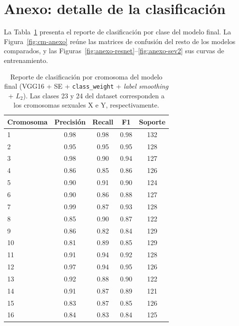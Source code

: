\documentclass[11pt,a4paper]{article}
\begin{document}



\appendix
\section{Anexo: detalle de la clasificación}
\label{anexo:clasif}

La Tabla~\ref{tab:clasif-report} presenta el reporte de clasificación por clase del
modelo final. La Figura~\ref{fig:cm-anexo} reúne las matrices de confusión del resto
de los modelos comparados, y las Figuras~\ref{fig:anexo-resnet}--\ref{fig:anexo-sev2}
sus curvas de entrenamiento.

\begin{table}[H]
  \centering
  \small
  \caption{Reporte de clasificación por cromosoma del modelo final (VGG16 + SE +
  \texttt{class\_weight} + \textit{label smoothing} + \(L_2\)). Las clases 23 y 24
  del dataset corresponden a los cromosomas sexuales X e Y, respectivamente.}
  \label{tab:clasif-report}
  \begin{tabular}{lcccc}
    \toprule
    Cromosoma & Precisión & Recall & F1 & Soporte \\
    \midrule
    1  & 0.98 & 0.98 & 0.98 & 132 \\
    2  & 0.95 & 0.95 & 0.95 & 128 \\
    3  & 0.98 & 0.90 & 0.94 & 127 \\
    4  & 0.86 & 0.85 & 0.86 & 126 \\
    5  & 0.90 & 0.91 & 0.90 & 124 \\
    6  & 0.90 & 0.86 & 0.88 & 127 \\
    7  & 0.99 & 0.87 & 0.93 & 128 \\
    8  & 0.85 & 0.90 & 0.87 & 122 \\
    9  & 0.86 & 0.82 & 0.84 & 129 \\
    10 & 0.81 & 0.89 & 0.85 & 129 \\
    11 & 0.91 & 0.94 & 0.92 & 128 \\
    12 & 0.97 & 0.94 & 0.95 & 126 \\
    13 & 0.92 & 0.88 & 0.90 & 122 \\
    14 & 0.91 & 0.87 & 0.89 & 121 \\
    15 & 0.83 & 0.87 & 0.85 & 126 \\
    16 & 0.84 & 0.83 & 0.84 & 125 \\

\end{tabular}
\end{table}
\end{document}
